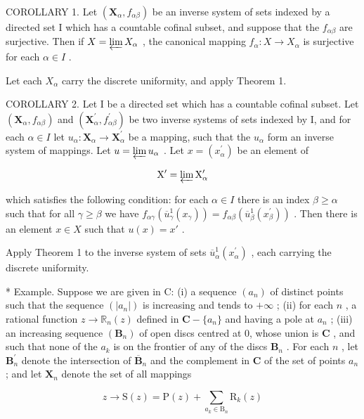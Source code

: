 COROLLARY 1. Let \((\mathbf{X}_{\alpha}, f_{\alpha\beta})\) be an inverse system of sets indexed by a directed set I which has a countable cofinal subset, and suppose that the \(f_{\alpha\beta}\) are surjective. Then if \(X = \varprojlim X_{\alpha}\) , the canonical mapping \(f_{\alpha}: X \to X_{\alpha}\) is surjective for each \(\alpha \in I\) .

Let each \(X_{\alpha}\) carry the discrete uniformity, and apply Theorem 1.

COROLLARY 2. Let I be a directed set which has a countable cofinal subset. Let \((\mathbf{X}_{\alpha}, f_{\alpha \beta})\) and \((\mathbf{X}_{\alpha}^{\prime}, f_{\alpha \beta}^{\prime})\) be two inverse systems of sets indexed by I, and for each \(\alpha \in I\) let \(u_{\alpha}: \mathbf{X}_{\alpha} \to \mathbf{X}_{\alpha}^{\prime}\) be a mapping, such that the \(u_{\alpha}\) form an inverse system of mappings. Let \(u = \varprojlim u_{\alpha}\) . Let \(x = (x_{\alpha}^{\prime})\) be an element of

\[
\mathrm{X} ^ {\prime} = \varprojlim \mathrm{X} _ {\alpha} ^ {\prime}
\]

which satisfies the following condition: for each \(\alpha \in I\) there is an index \(\beta \geqslant \alpha\) such that for all \(\gamma \geqslant \beta\) we have \(f_{\alpha \gamma}(\overline{u}_{\gamma}^{1}(x_{\gamma})) = f_{\alpha \beta}(\overline{u}_{\beta}^{1}(x_{\beta}^{\prime}))\) . Then there is an element \(x \in X\) such that \(u(x) = x'\) .

Apply Theorem 1 to the inverse system of sets \(\overline{u}_{\alpha}^{1}(x_{\alpha}^{\prime})\) , each carrying the discrete uniformity.

* Example. Suppose we are given in C: (i) a sequence \((a_{n})\) of distinct points such that the sequence \((|a_{n}|)\) is increasing and tends to \(+\infty\) ; (ii) for each \(n\) , a rational function \(z \to \mathbb{R}_{n}(z)\) defined in \(\mathbf{C} - \{a_{n}\}\) and having a pole at \(a_{n}\) ; (iii) an increasing sequence \((\mathbf{B}_{n})\) of open discs centred at 0, whose union is \(\mathbf{C}\) , and such that none of the \(a_{k}\) is on the frontier of any of the discs \(\mathbf{B}_{n}\) . For each \(n\) , let \(\mathbf{B}_{n}^{\prime}\) denote the intersection of \(\overline{\mathbf{B}}_{n}\) and the complement in \(\mathbf{C}\) of the set of points \(a_{n}\) ; and let \(\mathbf{X}_{n}\) denote the set of all mappings

\[
z \rightarrow \mathrm{S} (z) = \mathrm{P} (z) + \sum_ {a _ {k} \in \mathrm{B} _ {n}} \mathrm{R} _ {k} (z)
\]

